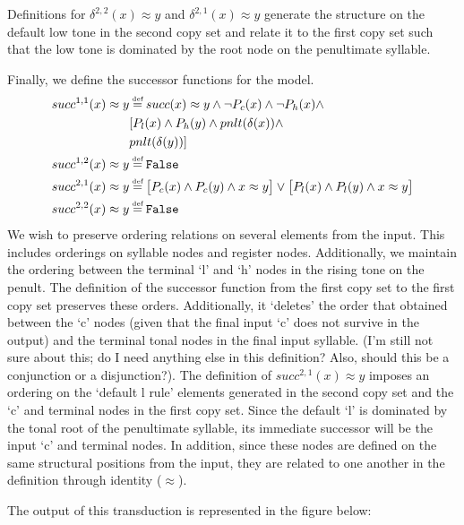 \documentclass{article}
\newcommand\myeq{\mathrel{\stackrel{\makebox[0pt]{\mbox{\normalfont\tiny def}}}{=}}}
\newcommand{\ap}{\approx}
\begin{document}
Definitions for $\delta^{2,2}(x)\ap y$ and $\delta^{2,1}(x)\ap y$ generate the structure on the default low tone in the second copy set and relate it to the first copy set such that the low tone is dominated by the root node on the penultimate syllable. \par
Finally, we define the successor functions for the model.
\begin{equation}
\begin{aligned}
succ^{1,1}(x)\ap y &\myeq succ(x)\ap y \land \neg P_{c}(x) \land \neg P_{h}(x)\land \\
&[P_{l}(x)\land P_{h}(y)\land pnlt(\delta(x))\land \\
&pnlt(\delta(y))] \\
succ^{1,2}(x)\ap y &\myeq \mathtt{False} \\
succ^{2,1}(x)\ap y &\myeq \big[P_{c}(x)\land P_{c}(y)\land x\ap y\big] \lor \big[P_{l}(x)\land P_{l}(y)\land x\ap y\big] \\
succ^{2,2}(x)\ap y &\myeq \mathtt{False} \\
\end{aligned}
\end{equation}
We wish to preserve ordering relations on several elements from the input. This includes orderings on syllable nodes and register nodes. Additionally, we maintain the ordering between the terminal `l' and `h' nodes in the rising tone on the penult. The definition of the successor function from the first copy set to the first copy set preserves these orders. Additionally, it `deletes' the order that obtained between the `c' nodes (given that the final input `c' does not survive in the output) and the terminal tonal nodes in the final input syllable. (I'm still not sure about this; do I need anything else in this definition? Also, should this be a conjunction or a disjunction?). The definition of $succ^{2,1}(x)\ap y$ imposes an ordering on the `default l rule' elements generated in the second copy set and the `c' and terminal nodes in the first copy set. Since the default `l' is dominated by the tonal root of the penultimate syllable, its immediate successor will be the input `c' and terminal nodes. In addition, since these nodes are defined on the same structural positions from the input, they are related to one another in the definition through identity ($\ap$).\par
The output of this transduction is represented in the figure below:
\end{document}
